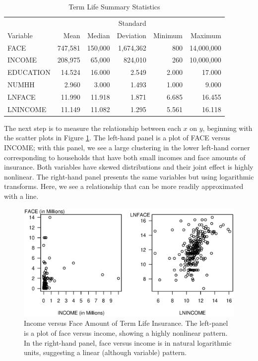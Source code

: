 \begin{table}[h]
\caption{\label{T3:FaceSumStats} Term Life Summary Statistics}
\begin{center}
\begin{tabular}{lrrrrr}
\hline
                     &  & & Standard &  &  \\
Variable & Mean & Median & Deviation & Minimum & Maximum \\
\hline
      FACE &    747,581 &    150,000 &  1,674,362 &        800 & 14,000,000 \\
    INCOME &    208,975 &     65,000 &    824,010 &        260 & 10,000,000 \\
 EDUCATION &     14.524 &     16.000 &      2.549 &      2.000 &     17.000 \\
     NUMHH &      2.960 &      3.000 &      1.493 &      1.000 &      9.000 \\
    LNFACE &     11.990 &     11.918 &      1.871 &      6.685 &     16.455 \\
  LNINCOME &     11.149 &     11.082 &      1.295 &      5.561 &     16.118 \\
\hline
\end{tabular}\end{center}\end{table}

The next step is to measure the relationship between each $x$ on
$y$, beginning with the scatter plots in Figure
\ref{F3:TermLifeTwoPlots}. The left-hand panel is a plot of FACE
versus INCOME; with this panel, we see a large clustering in the
lower left-hand corner corresponding to households that have both
small incomes and face amounts of insurance. Both variables have
skewed distributions and their joint effect is highly nonlinear. The
right-hand panel presents the same variables but using logarithmic
transforms. Here, we see a relationship that can be more readily
approximated with a line.


\begin{figure}[htp]
  \begin{center}
    \includegraphics[width=.8\textwidth]{Chapter3/F3TermLifeTwoPlots.eps}
    \caption{\label{F3:TermLifeTwoPlots} \small  Income versus Face Amount of Term Life Insurance. The
left-panel is a plot of face versus income, showing a highly
nonlinear pattern. In the right-hand panel, face versus income is in
natural logarithmic units, suggesting a linear (although variable)
pattern.}
  \end{center}
\end{figure}

